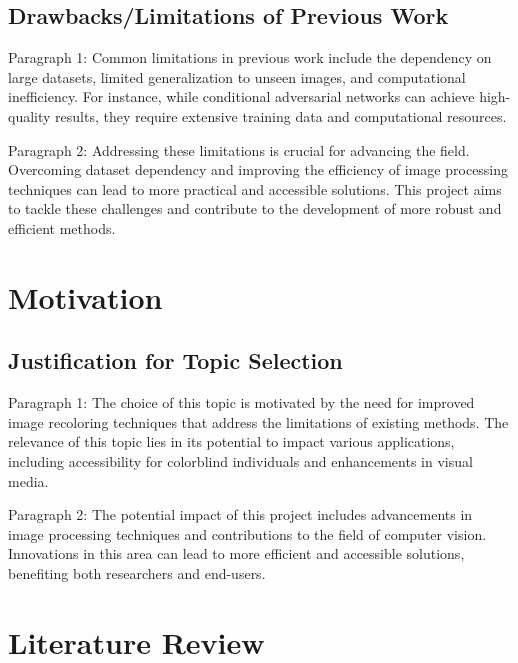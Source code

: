 \documentclass{article}
\begin{document}
\subsection{Drawbacks/Limitations of Previous Work}

Paragraph 1: Common limitations in previous work include the dependency on large datasets, limited generalization to unseen images, and computational inefficiency. For instance, while conditional adversarial networks can achieve high-quality results, they require extensive training data and computational resources.

Paragraph 2: Addressing these limitations is crucial for advancing the field. Overcoming dataset dependency and improving the efficiency of image processing techniques can lead to more practical and accessible solutions. This project aims to tackle these challenges and contribute to the development of more robust and efficient methods.

\section{Motivation}

\subsection{Justification for Topic Selection}

Paragraph 1: The choice of this topic is motivated by the need for improved image recoloring techniques that address the limitations of existing methods. The relevance of this topic lies in its potential to impact various applications, including accessibility for colorblind individuals and enhancements in visual media.

Paragraph 2: The potential impact of this project includes advancements in image processing techniques and contributions to the field of computer vision. Innovations in this area can lead to more efficient and accessible solutions, benefiting both researchers and end-users.

\section{Literature Review}
\end{document}
